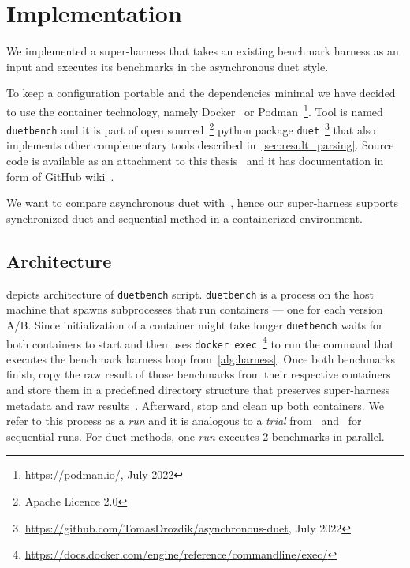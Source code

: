 \chapter{Implementation}
\label{chap:impl}

We implemented a super-harness that takes an existing benchmark harness as an input and executes its benchmarks in the asynchronous duet style.

To keep a configuration portable and the dependencies minimal we have decided to use the container technology, namely Docker~\cite{merkel2014docker} or Podman~\footnote{\url{https://podman.io/}, July 2022}.
Tool is named \lstinline{duetbench} and it is part of open sourced~\footnote{Apache Licence 2.0} python package \lstinline{duet}~\footnote{\url{https://github.com/TomasDrozdik/asynchronous-duet}, July 2022} that also implements other complementary tools described in~\cref{sec:result_parsing}.
Source code is available as an attachment to this thesis~ and it has documentation in form of GitHub wiki~\cite{wiki}.

We want to compare asynchronous duet with~\citet{bulej2020duet}, hence our super-harness supports synchronized duet and sequential method in a containerized environment.

\section{Architecture}

 depicts architecture of \lstinline{duetbench} script.
\lstinline{duetbench} is a process on the host machine that spawns subprocesses that run containers --- one for each version A/B.
Since initialization of a container might take longer \lstinline{duetbench} waits for both containers to start and then uses \lstinline{docker exec}~\footnote{\url{https://docs.docker.com/engine/reference/commandline/exec/}} to run the command that executes the benchmark harness loop from~\cref{alg:harness}.
Once both benchmarks finish, copy the raw result of those benchmarks from their respective containers and store them in a predefined directory structure that preserves super-harness metadata and raw results~\cite{wiki}.
Afterward, stop and clean up both containers.
We refer to this process as a \emph{run} and it is analogous to a \emph{trial} from~\citet{laaber2019software} and~\citet{abedi2017conducting} for sequential runs.
For duet methods, one \emph{run} executes 2 benchmarks in parallel.

